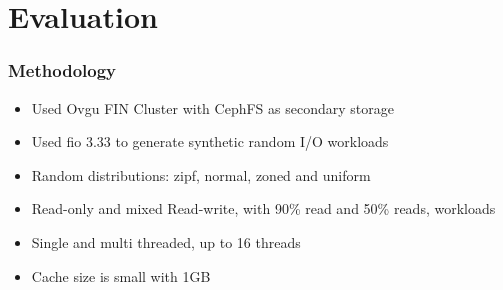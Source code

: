 \documentclass[
	aspectratio=169,
	compress,
]{beamer}
\newcommand{\navframetitle}[1]{\frametitle{#1\hfill{\footnotesize\lastsection{}}}}
\begin{document}
%
%
%
\section{Evaluation}
\label{sec:evaluation}

\begin{frame}[fragile]
	\navframetitle{Methodology}

	\begin{itemize}
		\item Used Ovgu FIN Cluster with CephFS as secondary storage
		\item Used fio 3.33 to generate synthetic random I/O workloads
		\item Random distributions: zipf, normal, zoned and uniform
		\item Read-only and mixed Read-write, with 90\% read and 50\% reads, workloads
		\item Single and multi threaded, up to 16 threads
		\item Cache size is small with 1GB
 	\end{itemize}
\end{frame}
\end{document}
